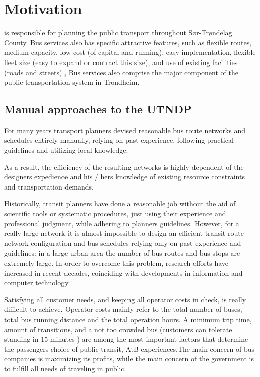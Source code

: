 \section{Motivation}


 \citet{website:atb} is responsible for planning the public transport throughout Sør-Trøndelag County. Bus services also has specific attractive features, such as flexible routes, medium capacity, low cost (of capital and running), easy implementation, flexible fleet size (easy to expand or contract this size), and use of existing facilities (roads and streets)., Bus services also comprise the major component of the public transportation system in Trondheim.

 \subsection{Manual approaches to the UTNDP}

 For many years transport planners devised reasonable bus route networks and schedules entirely manually, relying on past experience, following practical guidelines and utilizing local knowledge.

 As a result, the efficiency of the resulting networks is highly dependent of the designers expedience and his / hers knowledge of existing resource constraints and transportation demands. 

 Historically, transit planners have done a reasonable job without the aid of scientific tools or systematic procedures, just using their experience and professional judgment, while adhering to planners guidelines. However, for a really large network it is almost impossible to design an efficient transit route network configuration and bus schedules relying only on past experience and guidelines: in a large urban area the number of bus routes and bus stops are extremely large. In order to overcome this problem, research efforts have increased in recent decades, coinciding with developments in information and computer technology. 

 Satisfying all customer needs, and keeping all operator costs in check, is really difficult to achieve. Operator costs mainly refer to the total number of buses, total bus running distance and the total operation hours. A minimum trip time, amount of transitions, and a not too crowded bus (customers can tolerate standing in 15 minutes ) are among the most important factors that determine the passengers choice of public transit, AtB experiences.The main concern of bus companies is maximizing its profits, while the main concern of the government is to fulfill all needs of traveling in public. 

